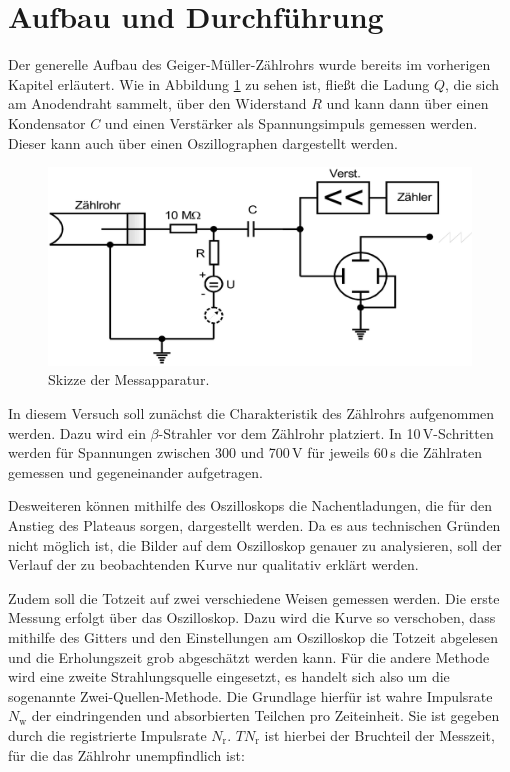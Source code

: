 \section{Aufbau und Durchführung}

Der generelle Aufbau des Geiger-Müller-Zählrohrs wurde bereits im vorherigen Kapitel erläutert. Wie in Abbildung \ref{fig:schaltbild} zu sehen ist, fließt die Ladung $Q$, die sich am Anodendraht sammelt, über den Widerstand $R$ und kann dann über einen 
Kondensator $C$ und einen Verstärker als Spannungsimpuls gemessen werden. Dieser kann auch über einen Oszillographen dargestellt werden.


\begin{figure}[h!tbp]
	\centering
	\includegraphics[width=0.7\linewidth]{schaltbild.png}
	\caption{Skizze der Messapparatur.\cite[7]{anleitung703}}
	\label{fig:schaltbild}
\end{figure}

In diesem Versuch soll zunächst die Charakteristik des Zählrohrs aufgenommen werden. Dazu wird ein $\beta$-Strahler vor dem Zählrohr platziert. In 10\,V-Schritten werden für Spannungen zwischen 300 und 700\,V für jeweils 60\,s die Zählraten gemessen 
und gegeneinander aufgetragen.

Desweiteren können mithilfe des Oszilloskops die Nachentladungen, die für den Anstieg des Plateaus sorgen, dargestellt werden. Da es aus technischen Gründen nicht möglich ist, die Bilder auf dem Oszilloskop genauer zu analysieren, soll der Verlauf der
zu beobachtenden Kurve nur qualitativ erklärt werden.

Zudem soll die Totzeit auf zwei verschiedene Weisen gemessen werden. Die erste Messung erfolgt über das Oszilloskop. Dazu wird die Kurve so verschoben, dass mithilfe des Gitters und den Einstellungen am Oszilloskop die Totzeit abgelesen und die 
Erholungszeit grob abgeschätzt werden kann. Für die andere Methode wird eine zweite Strahlungsquelle eingesetzt, es handelt sich also um die sogenannte Zwei-Quellen-Methode. Die Grundlage hierfür ist wahre Impulsrate $N_{\text{w}}$ der eindringenden und absorbierten
Teilchen pro Zeiteinheit. Sie ist gegeben durch die registrierte Impulsrate $N_{\text{r}}$. $TN_{\text{r}}$ ist hierbei der Bruchteil der Messzeit, für die das Zählrohr unempfindlich ist:

